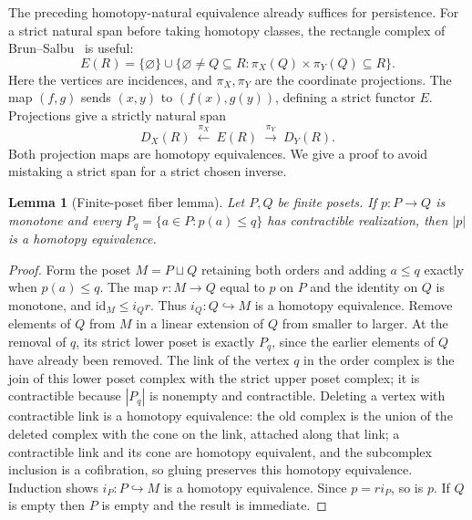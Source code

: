 \documentclass[11pt]{article}
\newtheorem{lemma}[theorem]{Lemma}
\theoremstyle{remark}
\begin{document}
The preceding homotopy-natural equivalence already suffices for persistence.
For a strict natural span before taking homotopy classes, the rectangle
complex of Brun--Salbu~\cite{nb:brun-salbu} is useful:
\[
 E(R)=\{\varnothing\}\cup
 \{\varnothing\neq Q\subseteq R:
           \pi_X(Q)\times\pi_Y(Q)\subseteq R\}.
\]
Here the vertices are incidences, and $\pi_X,\pi_Y$ are the coordinate
projections. The map $(f,g)$ sends $(x,y)$ to $(f(x),g(y))$, defining a
strict functor $E$. Projections give a strictly natural span
\[
 D_X(R)\ \xleftarrow{\pi_X}\ E(R)\ \xrightarrow{\pi_Y}\ D_Y(R).
\]
Both projection maps are homotopy equivalences. We give a proof to avoid
mistaking a strict span for a strict chosen inverse.

\begin{lemma}[Finite-poset fiber lemma]\label{cg:finite-fiber}
Let $P,Q$ be finite posets. If $p:P\to Q$ is monotone and every
$P_q=\{a\in P:p(a)\leq q\}$ has contractible realization, then $|p|$
is a homotopy equivalence.
\end{lemma}
\begin{proof}
Form the poset $M=P\sqcup Q$ retaining both orders and adding
$a\leq q$ exactly when $p(a)\leq q$. The map $r:M\to Q$ equal to $p$
on $P$ and the identity on $Q$ is monotone, and
$\mathrm{id}_M\leq i_Qr$. Thus $i_Q:Q\hookrightarrow M$ is a homotopy
equivalence. Remove elements of $Q$ from $M$ in a linear extension of $Q$
from smaller to larger. At the removal of $q$, its strict lower poset is
exactly $P_q$, since the earlier elements of $Q$ have already been removed.
The link of the vertex $q$ in the order complex is the join of this lower
poset complex with the strict upper poset complex; it is contractible
because $|P_q|$ is nonempty and contractible. Deleting a vertex with
contractible link is a homotopy equivalence: the old complex is the union
of the deleted complex with the cone on the link, attached along that link;
a contractible link and its cone are homotopy equivalent, and the
subcomplex inclusion is a cofibration, so gluing preserves this homotopy
equivalence. Induction shows $i_P:P\hookrightarrow M$ is a homotopy
equivalence. Since $p=r i_P$, so is $p$.
If $Q$ is empty then $P$ is empty and the result is immediate.
\end{proof}
\end{document}
